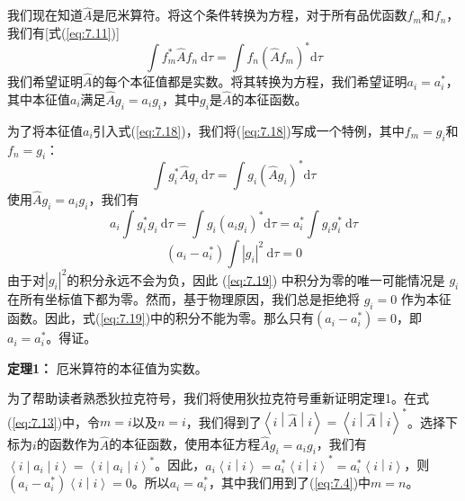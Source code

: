     我们现在知道$\hat{A}$是厄米算符。将这个条件转换为方程，对于所有品优函数$f_m$和$f_n$，我们有[式(\ref{eq:7.11})]
    \begin{equation}
        \int f^{\ast}_m \hat{A} f_n \:\mathrm{d}\tau = \int f_n \left(\hat{A} f_m\right)^{\ast} \mathrm{d}\tau
        \label{eq:7.18}
    \end{equation}
    我们希望证明$\hat{A}$的每个本征值都是实数。将其转换为方程，我们希望证明$a_i = a_i^{\ast}$，其中本征值$a_i$满足$\hat{A}g_i = a_i g_i$，其中$g_i$是$\hat{A}$的本征函数。

    为了将本征值$a_i$引入式(\ref{eq:7.18})，我们将(\ref{eq:7.18})写成一个特例，其中$f_m = g_i$和$f_n = g_i$：
    \begin{equation*}
        \int g_i^{\ast} \hat{A} g_i \:\mathrm{d}\tau = \int g_i \left(\hat{A} g_i\right)^{\ast} \mathrm{d}\tau
    \end{equation*}
    使用$\hat{A} g_i = a_i g_i$，我们有
    \begin{equation*}
        a_i \int g_i^{\ast} g_i \:\mathrm{d}\tau = \int g_i \left(a_i g_i\right)^{\ast} \mathrm{d}\tau = a_i^{\ast} \int g_i g_i^{\ast} \:\mathrm{d}\tau
    \end{equation*}
    \begin{equation}
        \left(a_i - a_i^{\ast}\right) \int \left|g_i\right|^2 \:\mathrm{d}\tau = 0
        \label{eq:7.19}
    \end{equation}
    由于对$\left|g_i\right|^2$的积分永远不会为负，因此 (\ref{eq:7.19}) 中积分为零的唯一可能情况是 $g_i$ 在所有坐标值下都为零。然而，基于物理原因，我们总是拒绝将 $g_i=0$ 作为本征函数。因此，式(\ref{eq:7.19})中的积分不能为零。那么只有$\left(a_i - a_i^{\ast}\right) = 0$，即$a_i = a_i^{\ast}$。得证。

    \begin{center}
        \parbox{0.8\textwidth}{
            \centering 
            \textbf{定理1：} 厄米算符的本征值为实数。
        }
    \end{center}

    为了帮助读者熟悉狄拉克符号，我们将使用狄拉克符号重新证明定理1。在式(\ref{eq:7.13})中，令$m=i$以及$n=i$，我们得到了$\left\langle i \middle| \hat{A} \middle| i \right\rangle = \left\langle i \middle| \hat{A} \middle| i \right\rangle^{\ast}$。选择下标为$i$的函数作为$\hat{A}$的本征函数，使用本征方程$\hat{A} g_i = a_i g_i$，我们有$\left\langle i \middle| a_i \middle| i \right\rangle = \left\langle i \middle| a_i \middle| i \right\rangle^{\ast}$。因此，$a_i \left\langle i \middle| i \right\rangle = a_i^{\ast} \left\langle i \middle| i \right\rangle^{\ast} = a_i^{\ast}\left\langle i \middle| i \right\rangle$，则$\left(a_i - a_i^{\ast}\right)\left\langle i \middle| i \right\rangle = 0$。所以$a_i = a_i^{\ast}$，其中我们用到了(\ref{eq:7.4})中$m=n$。

